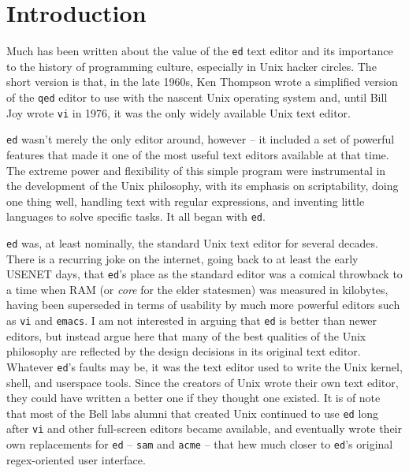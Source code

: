 \documentclass[12pt]{article}
\begin{document}
\maketitle

\begin{abstract}
\end{abstract}

\section{Introduction}

Much has been written about the value of the \lstinline{ed} text editor
and its importance to the history of programming culture, especially
in Unix hacker circles. The short version is that, in the late 1960s,
Ken Thompson wrote a simplified version of the \lstinline{qed} editor
to use with the nascent Unix operating system and, until Bill Joy
wrote \lstinline{vi} in 1976, it was the only widely available Unix
text editor.

\lstinline{ed} wasn't merely the only editor around, however --
it included a set of powerful features
that made it one of the most useful text editors available at
that time. The extreme power and flexibility of this simple
program were instrumental in the development of the Unix philosophy,
with its emphasis on scriptability, doing one thing well, handling
text with regular expressions, and inventing little languages
to solve specific tasks. It all began with \lstinline{ed}.

\lstinline{ed} was, at least nominally, the standard Unix text editor
for several decades.
There is a recurring joke on the internet, going back to at least the early
USENET days,
that \lstinline{ed}'s place as the standard editor was a comical throwback
to a time when RAM (or \emph{core} for the elder statesmen) was measured
in kilobytes, having been superseded in terms of usability by much more
powerful editors such as \lstinline{vi} and \lstinline{emacs}.
I am not interested in arguing that \lstinline{ed} is better
than newer editors, but instead argue here that many of the
best qualities of the Unix philosophy are reflected by the design decisions
in its original text editor.
Whatever \lstinline{ed}'s faults may be, it was the text editor used to write
the Unix kernel, shell, and userspace tools. Since the creators of Unix
wrote their own text editor, they could have written a better one if they thought one existed. It is
of note that most of the Bell labs alumni that created Unix continued
to use \lstinline{ed} long after \lstinline{vi} and other full-screen editors
became available, and eventually wrote their own replacements for \lstinline{ed} --
\lstinline{sam} and \lstinline{acme} -- that hew much closer to \lstinline{ed}'s
original regex-oriented user interface.
\end{document}
